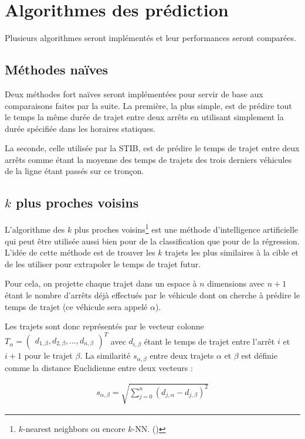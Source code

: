 \documentclass[letterpaper]{article}
\begin{document}
\section{Algorithmes des prédiction}
Plusieurs algorithmes seront implémentés et leur performances seront comparées.

\subsection{Méthodes naïves}
Deux méthodes fort naïves seront implémentées pour servir de base aux comparaisons faites par la suite.
La première, la plus simple, est de prédire tout le temps la même durée de trajet entre deux arrêts en utilisant simplement la durée spécifiée dans les horaires statiques.

La seconde, celle utilisée par la STIB, est de prédire le temps de trajet entre deux arrêts comme étant la moyenne des temps de trajets des trois derniers véhicules de la ligne étant passés sur ce tronçon.

\subsection{$k$ plus proches voisins}

L'algorithme des $k$ plus proches voisins\footnote{$k$-nearest neighbors ou encore $k$-NN. (\cite{trevor2009elements})}
est une méthode d'intelligence artificielle qui peut être utilisée aussi bien pour de la classification que pour de la régression.
L'idée de cette méthode est de trouver les $k$ trajets les plus similaires à la cible et de les utiliser pour extrapoler le temps de trajet futur.

Pour cela, on projette chaque trajet dans un espace à $n$ dimensions avec $n+1$ étant le nombre d'arrêts déjà effectués par le véhicule dont on cherche à prédire le temps de trajet (ce véhicule sera appelé $\alpha$).

Les trajets sont donc représentés par le vecteur colonne
$T_{\alpha} = \begin{pmatrix}d_{1,\beta}, d_{2,\beta}, ..., d_{n,\beta}\end{pmatrix}^{T}$
avec $d_{i,\beta}$ étant le temps de trajet entre l'arrêt $i$ et $i+1$ pour le trajet $\beta$.
La similarité $s_{\alpha,\beta}$ entre deux trajets $\alpha$ et $\beta$ est définie comme la distance Euclidienne entre deux vecteurs :

\begin{eqnarray}
s_{\alpha,\beta} = \sqrt{\sum_{j=0}^{n}(d_{j,\alpha} - d_{j,\beta})^2}
\end{eqnarray}
\end{document}
